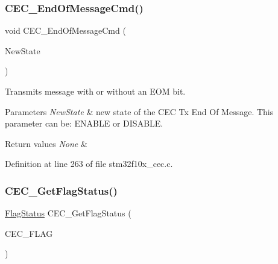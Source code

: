 \subsubsection{\texorpdfstring{C\+E\+C\+\_\+\+End\+Of\+Message\+Cmd()}{CEC\_EndOfMessageCmd()}}
{\footnotesize\ttfamily void C\+E\+C\+\_\+\+End\+Of\+Message\+Cmd (\begin{DoxyParamCaption}\item[{\hyperlink{group___exported__types_gac9a7e9a35d2513ec15c3b537aaa4fba1}{Functional\+State}}]{New\+State }\end{DoxyParamCaption})}



Transmits message with or without an E\+OM bit. 


\begin{DoxyParams}{Parameters}
{\em New\+State} & new state of the C\+EC Tx End Of Message. This parameter can be\+: E\+N\+A\+B\+LE or D\+I\+S\+A\+B\+LE. \\
\hline
\end{DoxyParams}

\begin{DoxyRetVals}{Return values}
{\em None} & \\
\hline
\end{DoxyRetVals}


Definition at line 263 of file stm32f10x\+\_\+cec.\+c.

\mbox{\label{group___c_e_c___exported___functions_gaf920706cb350182bf0728c66868053ca}} 
\subsubsection{\texorpdfstring{C\+E\+C\+\_\+\+Get\+Flag\+Status()}{CEC\_GetFlagStatus()}}
{\footnotesize\ttfamily \hyperlink{group___exported__types_ga89136caac2e14c55151f527ac02daaff}{Flag\+Status} C\+E\+C\+\_\+\+Get\+Flag\+Status (\begin{DoxyParamCaption}\item[{uint32\+\_\+t}]{C\+E\+C\+\_\+\+F\+L\+AG }\end{DoxyParamCaption})}



